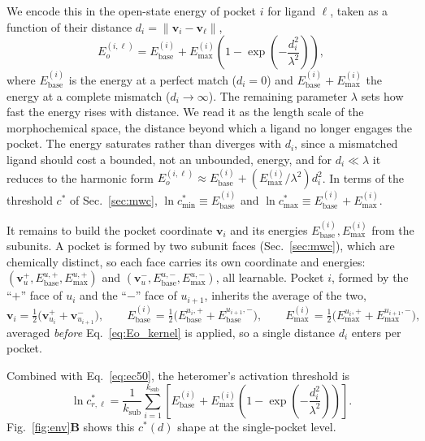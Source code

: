 \documentclass[aps,pre,superscriptaddress,floatfix,longbibliography,linenumbers]{revtex4-2}
\begin{document}
We encode this in the open-state energy of pocket $i$ for ligand $\ell$,
taken as a function of their distance $d_i=\|\mathbf v_i-\mathbf v_\ell\|$,
\begin{equation}
E_o^{(i,\ell)} = E_\text{base}^{(i)} + E_\text{max}^{(i)}\left(1-\exp\!\left(-\frac{d_i^2}{\lambda^2}\right)\right),
\label{eq:Eo_kernel}
\end{equation}
where $E_\text{base}^{(i)}$ is the energy at a perfect match ($d_i=0$) and
$E_\text{base}^{(i)}+E_\text{max}^{(i)}$ the energy at a complete mismatch
($d_i\to\infty$). The remaining parameter $\lambda$ sets how fast the energy
rises with distance. We read it as the length scale of the morphochemical
space, the distance beyond which a ligand no longer engages the pocket. The
energy saturates rather than diverges with $d_i$, since a mismatched ligand
should cost a bounded, not an unbounded, energy, and for $d_i\ll\lambda$ it
reduces to the harmonic form
$E_o^{(i,\ell)}\approx E_\text{base}^{(i)}+(E_\text{max}^{(i)}/\lambda^2)d_i^2$.
In terms of the threshold $c^*$ of Sec.~\ref{sec:mwc},
$\ln c^*_\text{min}\equiv E_\text{base}^{(i)}$ and
$\ln c^*_\text{max}\equiv E_\text{base}^{(i)}+E_\text{max}^{(i)}$.

It remains to build the pocket coordinate $\mathbf v_i$ and its energies
$E_\text{base}^{(i)},E_\text{max}^{(i)}$ from the subunits. A pocket is
formed by two subunit faces (Sec.~\ref{sec:mwc}), which are chemically
distinct, so each face carries its own coordinate and energies:
$(\mathbf v_u^{+},E_\text{base}^{u,+},E_\text{max}^{u,+})$ and
$(\mathbf v_u^{-},E_\text{base}^{u,-},E_\text{max}^{u,-})$, all learnable.
Pocket $i$, formed by the ``$+$'' face of $u_i$ and the ``$-$'' face of
$u_{i+1}$, inherits the average of the two,
\begin{equation}
\mathbf v_i = \tfrac{1}{2}\bigl(\mathbf v_{u_i}^{+} + \mathbf v_{u_{i+1}}^{-}\bigr),
\qquad
E_\text{base}^{(i)} = \tfrac{1}{2}\bigl(E_\text{base}^{u_i,+} + E_\text{base}^{u_{i+1},-}\bigr),
\qquad
E_\text{max}^{(i)} = \tfrac{1}{2}\bigl(E_\text{max}^{u_i,+} + E_\text{max}^{u_{i+1},-}\bigr),
\label{eq:pocket_embed}
\end{equation}
averaged \emph{before} Eq.~\eqref{eq:Eo_kernel} is applied, so a single
distance $d_i$ enters per pocket.

Combined with Eq.~\eqref{eq:ec50}, the heteromer's activation threshold is
\begin{equation}
\ln c^*_{r,\ell} = \frac{1}{k_\text{sub}}\sum_{i=1}^{k_\text{sub}}
\left[E_\text{base}^{(i)} + E_\text{max}^{(i)}\left(1-\exp\!\left(-\frac{d_i^2}{\lambda^2}\right)\right)\right].
\label{eq:threshold_full}
\end{equation}
Fig.~\ref{fig:env}\textbf{B} shows this $c^*(d)$ shape at the single-pocket
level.
\end{document}

